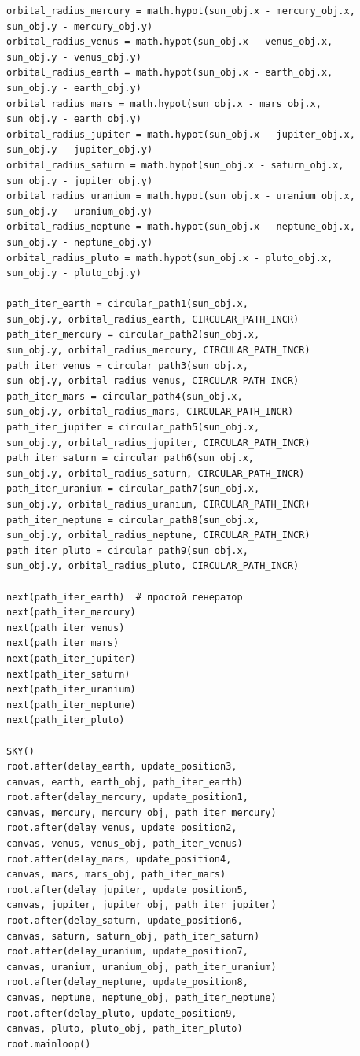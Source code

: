 \documentclass[11pt,a4paper]{report}
\begin{document}
\begin{verbatim}
orbital_radius_mercury = math.hypot(sun_obj.x - mercury_obj.x, 
sun_obj.y - mercury_obj.y)
orbital_radius_venus = math.hypot(sun_obj.x - venus_obj.x, 
sun_obj.y - venus_obj.y)
orbital_radius_earth = math.hypot(sun_obj.x - earth_obj.x, 
sun_obj.y - earth_obj.y)
orbital_radius_mars = math.hypot(sun_obj.x - mars_obj.x, 
sun_obj.y - earth_obj.y)
orbital_radius_jupiter = math.hypot(sun_obj.x - jupiter_obj.x, 
sun_obj.y - jupiter_obj.y)
orbital_radius_saturn = math.hypot(sun_obj.x - saturn_obj.x, 
sun_obj.y - jupiter_obj.y)
orbital_radius_uranium = math.hypot(sun_obj.x - uranium_obj.x, 
sun_obj.y - uranium_obj.y)
orbital_radius_neptune = math.hypot(sun_obj.x - neptune_obj.x, 
sun_obj.y - neptune_obj.y)
orbital_radius_pluto = math.hypot(sun_obj.x - pluto_obj.x, 
sun_obj.y - pluto_obj.y)

path_iter_earth = circular_path1(sun_obj.x, 
sun_obj.y, orbital_radius_earth, CIRCULAR_PATH_INCR)
path_iter_mercury = circular_path2(sun_obj.x, 
sun_obj.y, orbital_radius_mercury, CIRCULAR_PATH_INCR)
path_iter_venus = circular_path3(sun_obj.x, 
sun_obj.y, orbital_radius_venus, CIRCULAR_PATH_INCR)
path_iter_mars = circular_path4(sun_obj.x, 
sun_obj.y, orbital_radius_mars, CIRCULAR_PATH_INCR)
path_iter_jupiter = circular_path5(sun_obj.x,
sun_obj.y, orbital_radius_jupiter, CIRCULAR_PATH_INCR)
path_iter_saturn = circular_path6(sun_obj.x, 
sun_obj.y, orbital_radius_saturn, CIRCULAR_PATH_INCR)
path_iter_uranium = circular_path7(sun_obj.x, 
sun_obj.y, orbital_radius_uranium, CIRCULAR_PATH_INCR)
path_iter_neptune = circular_path8(sun_obj.x,
sun_obj.y, orbital_radius_neptune, CIRCULAR_PATH_INCR)
path_iter_pluto = circular_path9(sun_obj.x, 
sun_obj.y, orbital_radius_pluto, CIRCULAR_PATH_INCR)

next(path_iter_earth)  # простой генератор
next(path_iter_mercury)
next(path_iter_venus)
next(path_iter_mars)
next(path_iter_jupiter)
next(path_iter_saturn)
next(path_iter_uranium)
next(path_iter_neptune)
next(path_iter_pluto)

SKY()
root.after(delay_earth, update_position3,
canvas, earth, earth_obj, path_iter_earth)
root.after(delay_mercury, update_position1, 
canvas, mercury, mercury_obj, path_iter_mercury)
root.after(delay_venus, update_position2, 
canvas, venus, venus_obj, path_iter_venus)
root.after(delay_mars, update_position4, 
canvas, mars, mars_obj, path_iter_mars)
root.after(delay_jupiter, update_position5,
canvas, jupiter, jupiter_obj, path_iter_jupiter)
root.after(delay_saturn, update_position6, 
canvas, saturn, saturn_obj, path_iter_saturn)
root.after(delay_uranium, update_position7, 
canvas, uranium, uranium_obj, path_iter_uranium)
root.after(delay_neptune, update_position8, 
canvas, neptune, neptune_obj, path_iter_neptune)
root.after(delay_pluto, update_position9, 
canvas, pluto, pluto_obj, path_iter_pluto)
root.mainloop()

\end{verbatim}
\normalsize
\newpage
\end{document}
